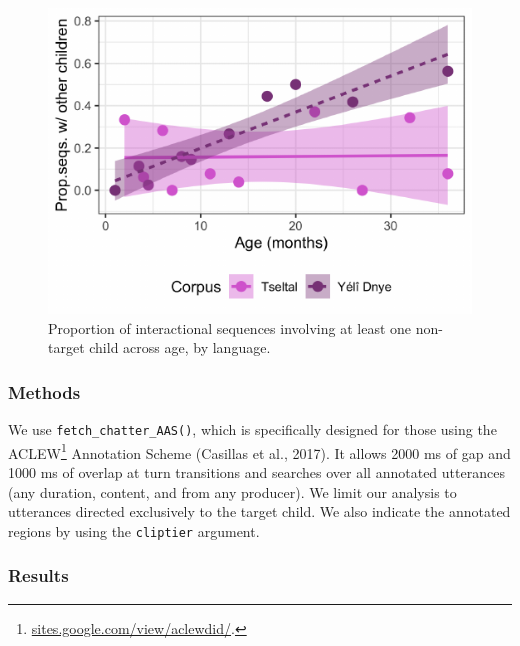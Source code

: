 \documentclass[10pt, letterpaper]{article}
\newenvironment{CodeChunk}{}{}
\begin{document}
\begin{CodeChunk}
\begin{figure}[h!]

{\centering \includegraphics{figs/tseyel.is.fig-1} 

}

\caption[Proportion of interactional sequences involving at least one non-target child across age, by language]{Proportion of interactional sequences involving at least one non-target child across age, by language.}\label{fig:tseyel.is.fig}
\end{figure}
\end{CodeChunk}

\hypertarget{methods}{%
\subsubsection{Methods}\label{methods}}

We use \texttt{fetch\_chatter\_AAS()}, which is specifically designed
for those using the ACLEW\footnote{\href{https://sites.google.com/view/aclewdid/home}{sites.google.com/view/aclewdid/}.}
Annotation Scheme (Casillas et al., 2017). It allows 2000 ms of gap and
1000 ms of overlap at turn transitions and searches over all annotated
utterances (any duration, content, and from any producer). We limit our
analysis to utterances directed exclusively to the target child. We also
indicate the annotated regions by using the \texttt{cliptier} argument.

\hypertarget{results}{%
\subsubsection{Results}\label{results}}
\end{document}
